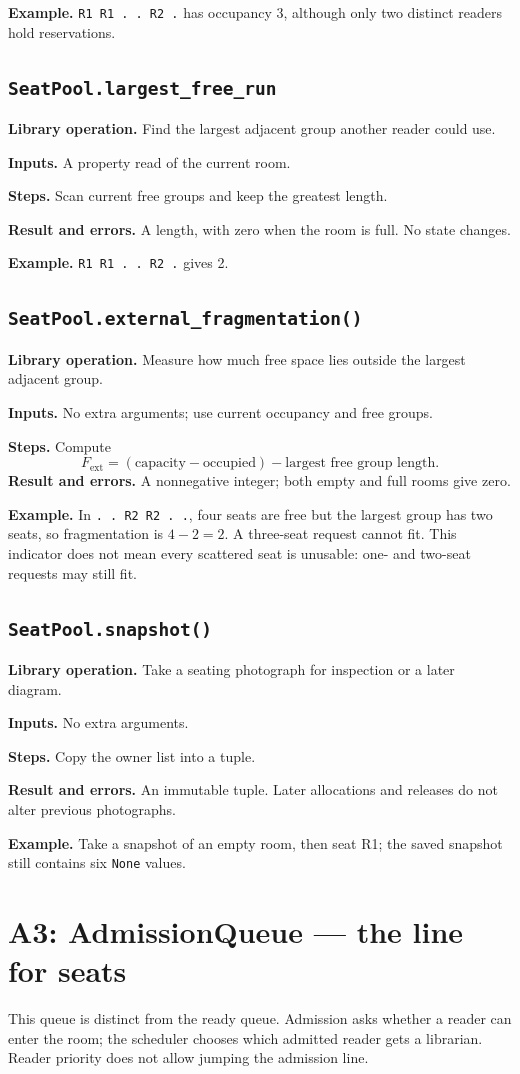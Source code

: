 \documentclass[11pt,a4paper]{article}
\newcommand{\routine}[2]{\subsection{\texorpdfstring{\texttt{#1}}{#2}}}
\newcommand{\librarymeaning}{\textbf{Library operation.} }
\newcommand{\arguments}{\textbf{Inputs.} }
\newcommand{\steps}{\textbf{Steps.} }
\newcommand{\result}{\textbf{Result and errors.} }
\newcommand{\example}{\textbf{Example.} }
\begin{document}
\example \texttt{R1 R1 . . R2 .} has occupancy 3, although only two
distinct readers hold reservations.

\routine{SeatPool.largest\_free\_run}{SeatPool largest free run property}
\librarymeaning Find the largest adjacent group another reader could use.

\arguments A property read of the current room.

\steps Scan current free groups and keep the greatest length.

\result A length, with zero when the room is full. No state changes.

\example \texttt{R1 R1 . . R2 .} gives 2.

\routine{SeatPool.external\_fragmentation()}{SeatPool external fragmentation}
\librarymeaning Measure how much free space lies outside the largest adjacent group.

\arguments No extra arguments; use current occupancy and free groups.

\steps Compute
\[
F_{\mathrm{ext}}=(\text{capacity}-\text{occupied})-
                  \text{largest free group length}.
\]
\result A nonnegative integer; both empty and full rooms give zero.

\example In \texttt{. . R2 R2 . .}, four seats are free but the largest
group has two seats, so fragmentation is $4-2=2$. A three-seat request
cannot fit. This indicator does not mean every scattered seat is unusable:
one- and two-seat requests may still fit.

\routine{SeatPool.snapshot()}{SeatPool snapshot}
\librarymeaning Take a seating photograph for inspection or a later diagram.

\arguments No extra arguments.

\steps Copy the owner list into a tuple.

\result An immutable tuple. Later allocations and releases do not alter
previous photographs.

\example Take a snapshot of an empty room, then seat R1; the saved
snapshot still contains six \texttt{None} values.

\section{A3: AdmissionQueue --- the line for seats}

This queue is distinct from the ready queue. Admission asks whether a reader
can enter the room; the scheduler chooses which admitted reader gets a
librarian. Reader priority does not allow jumping the admission line.
\end{document}
